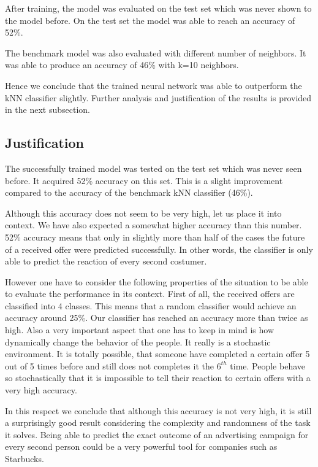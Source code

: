After training, the model was evaluated on the test set which was never shown to the model before. On the test set the model was able to reach an accuracy of 52\%. 

The benchmark model was also evaluated with different number of neighbors. It was able to produce an accuracy of 46\% with k=10 neighbors. 

Hence we conclude that the trained neural network was able to outperform the kNN classifier slightly. Further analysis and justification of the results is provided in the next subsection.


\subsection{Justification}

The successfully trained model was tested on the test set which was never seen before. It acquired 52\% accuracy on this set. This is a slight improvement compared to the accuracy of the benchmark kNN classifier (46\%). 

Although this accuracy does not seem to be very high, let us place it into context. We have also expected a somewhat higher accuracy than this number. 52\% accuracy means that only in slightly more than half of the cases the future of a received offer were predicted successfully. In other words, the classifier is only able to predict the reaction of every second costumer. 

However one have to consider the following properties of the situation to be able to evaluate the performance in its context. First of all, the received offers are classified into 4 classes. This means that a random classifier would achieve an accuracy around 25\%. Our classifier has reached an accuracy more than twice as high. Also a very important aspect that one has to keep in mind is how dynamically change the behavior of the people. It really is a stochastic environment. It is totally possible, that someone have completed a certain offer 5 out of 5 times before and still does not completes it the $6^{th}$ time. People behave so stochastically that it is impossible to tell their reaction to certain offers with a very high accuracy. 

In this respect we conclude that although this accuracy is not very high, it is still a surprisingly good result considering the complexity and randomness of the task it solves. Being able to predict the exact outcome of an advertising campaign for every second person could be a very powerful tool for companies such as Starbucks.

